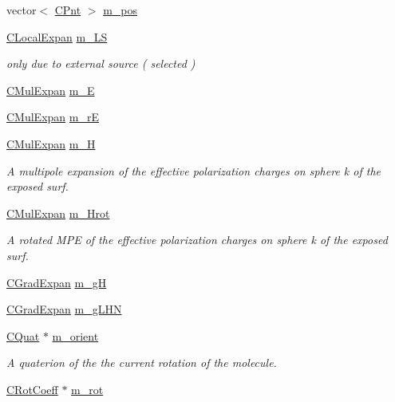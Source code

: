 \begin{DoxyCompactItemize}
\item 
vector$<$ \hyperlink{classCPnt}{C\-Pnt} $>$ \hyperlink{classCExpCenter_a6d2bc11475081445ad8838d6deb889d3}{m\-\_\-pos}
\item 
\hyperlink{classCLocalExpan}{C\-Local\-Expan} \hyperlink{classCExpCenter_a89612776d4a057bdd4d36a7b4e10e647}{m\-\_\-\-L\-S}
\begin{DoxyCompactList}\small\item\em only due to external source ( selected ) \end{DoxyCompactList}\item 
\hyperlink{classCMulExpan}{C\-Mul\-Expan} \hyperlink{classCExpCenter_a41728832a9a82eec510548f438e65734}{m\-\_\-\-E}
\item 
\hyperlink{classCMulExpan}{C\-Mul\-Expan} \hyperlink{classCExpCenter_a4c494c322b3272097b3b6aadfc2959f6}{m\-\_\-r\-E}
\item 
\hyperlink{classCMulExpan}{C\-Mul\-Expan} \hyperlink{classCExpCenter_a6cf480aad64c9baf8a126d308ca63f85}{m\-\_\-\-H}
\begin{DoxyCompactList}\small\item\em A multipole expansion of the effective polarization charges on sphere k of the exposed surf. \end{DoxyCompactList}\item 
\hyperlink{classCMulExpan}{C\-Mul\-Expan} \hyperlink{classCExpCenter_acfe6c4c74d9fd3069d00fef085eafbd8}{m\-\_\-\-Hrot}
\begin{DoxyCompactList}\small\item\em A rotated M\-P\-E of the effective polarization charges on sphere k of the exposed surf. \end{DoxyCompactList}\item 
\hyperlink{classCGradExpan}{C\-Grad\-Expan} \hyperlink{classCExpCenter_ae860d91bb83f5b31eff56694f6428e20}{m\-\_\-g\-H}
\item 
\hyperlink{classCGradExpan}{C\-Grad\-Expan} \hyperlink{classCExpCenter_a2ac196fbf3b2a5623553b4ecdc30cd7f}{m\-\_\-g\-L\-H\-N}
\item 
\hyperlink{classCQuat}{C\-Quat} $\ast$ \hyperlink{classCExpCenter_a49742562fd68129ab17aa716e6e661e8}{m\-\_\-orient}
\begin{DoxyCompactList}\small\item\em A quaterion of the the current rotation of the molecule. \end{DoxyCompactList}\item 
\hyperlink{classCRotCoeff}{C\-Rot\-Coeff} $\ast$ \hyperlink{classCExpCenter_a284a13e418738579f101ad9dc0af4dec}{m\-\_\-rot}

\end{DoxyCompactItemize}
